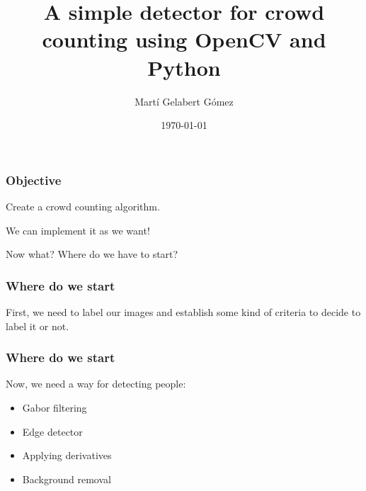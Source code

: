 \documentclass{beamer}
\title{A simple detector for crowd counting using OpenCV and Python}
\author{Martí Gelabert Gómez}
\institute{University of the Balearic Islands}
\date{\today}
\begin{document}
\frame{\titlepage}

\begin{frame}

    \frametitle{Objective}
    \centering
    Create a crowd counting algorithm.\newline \pause

    We can implement it as we want!\newline \pause

    Now what? Where do we have to start?

\end{frame}


\begin{frame}
    \frametitle{Where do we start}
    First, we need to label our images and establish some kind of criteria to decide to label it or not. 
     
\end{frame}


\begin{frame}
    \frametitle{Where do we start}
    Now, we need a way for detecting people:
    \begin{itemize}
        \item<2-> Gabor filtering  
        \item<3-> Edge detector  
        \item<4-> Applying derivatives 
        \item<5-> Background removal  {\color{green} \checkmark}
    \end{itemize}
     
\end{frame}

\end{document}
